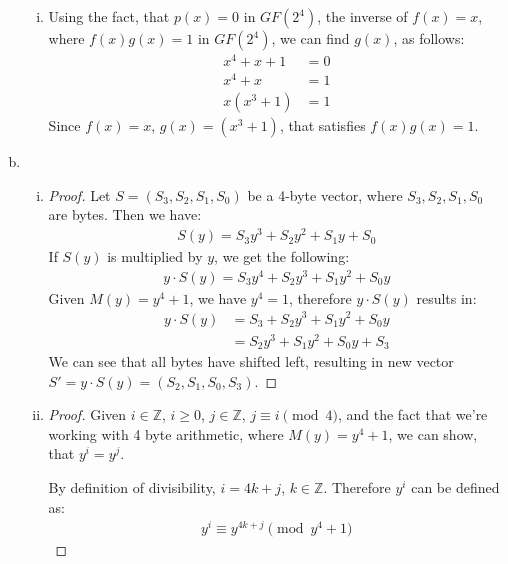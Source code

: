 \documentclass[11pt]{article}
\newcommand{\Z}{\mathbb{Z}}
\theoremstyle{definition}
\begin{document}
\begin{enumerate}[a.]
\begin{enumerate}[i. ]
      \item
        Using the fact, that $p(x) = 0$ in $GF(2^4)$, the inverse of $f(x) = x$, where $f(x)g(x) = 1$ in $GF(2^4)$, we can find $g(x)$, as follows:
        \begin{align*}
          x^4 + x + 1 &= 0 \\
          x^4 + x &= 1 \\
          x(x^3 + 1) &= 1
        \end{align*}
        Since $f(x) = x$, $g(x) = (x^3 + 1)$, that satisfies $f(x)g(x) = 1$.
    \end{enumerate}
  \item
    \begin{enumerate}[i. ]
      \item
        \begin{proof}
          Let $S = (S_3, S_2, S_1, S_0)$ be a 4-byte vector, where $S_3, S_2, S_1, S_0$ are bytes. Then we have:
          \begin{align*}
            S(y) = S_3y^3 + S_2y^2 + S_1y + S_0
          \end{align*}
          If $S(y)$ is multiplied by $y$, we get the following:
          \begin{align*}
            y \cdot S(y) = S_3y^4 + S_2y^3 + S_1y^2 + S_0y
          \end{align*}
          Given $M(y) = y^4 + 1$, we have $y^4 = 1$, therefore $y \cdot S(y)$ results in:
          \begin{align*}
            y \cdot S(y) &= S_3 + S_2y^3 + S_1y^2 + S_0y \\
                         &= S_2y^3 + S_1y^2 + S_0y + S_3
          \end{align*}
          We can see that all bytes have shifted left, resulting in new vector $S' = y \cdot S(y) = (S_2, S_1, S_0, S_3)$.
        \end{proof}

      \item
        \begin{proof}
          Given $i \in \Z$, $i \geq 0$, $j \in \Z$, $j \equiv i \pmod{4}$, and the fact that we're working with 4 byte arithmetic, where $M(y) = y^4 + 1$, we can show, that $y^i = y^j$.

          By definition of divisibility, $i = 4k + j$, $k \in \Z$. Therefore $y^i$ can be defined as:
          \begin{align*}
            y^i \equiv y^{4k + j} \pmod{y^4 + 1}
          \end{align*}


\end{proof}
\end{enumerate}
\end{enumerate}
\end{document}
